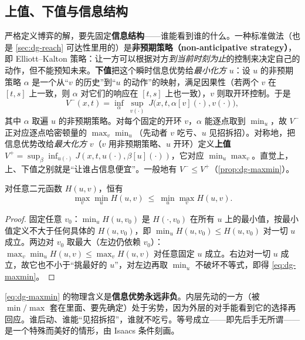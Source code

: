 \subsection{上值、下值与信息结构}
\label{sec:dg-info}
严格定义博弈的解，要先固定\textbf{信息结构}——谁能看到谁的什么。一种标准做法（也是 \cref{sec:dg-reach} 可达性里用的）是\textbf{非预期策略（non-anticipative strategy）}，即 Elliott--Kalton 策略：让一方可以根据对方\emph{到当前时刻为止}的控制来决定自己的动作，但不能预知未来。\textbf{下值}把这个瞬时信息优势给\emph{最小化方} $u$：设 $u$ 的非预期策略 $\alpha$ 是一个从“$v$ 的历史”到“$u$ 的动作”的映射，满足因果性（若两个 $v$ 在 $[t,s]$ 上一致，则 $\alpha$ 对它们的响应在 $[t,s]$ 上也一致），$v$ 则取开环控制。于是
\begin{equation}
  V^-(x,t)=\inf_{\alpha}\ \sup_{v(\cdot)}\ J\big(x,t,\alpha[v](\cdot),v(\cdot)\big),
  \label{eq:dg-lower}
\end{equation}
其中 $\alpha$ 取遍 $u$ 的非预期策略。对每个固定的开环 $v$，$\alpha$ 能逐点取到 $\min_u$，故 $V^-$ 正对应逐点哈密顿量的 $\max_v\min_u$（先动者 $v$ 吃亏、$u$ 见招拆招）。对称地，把信息优势改给\emph{最大化方} $v$（$v$ 用非预期策略、$u$ 开环）定义\textbf{上值} $V^+=\sup_{\beta}\inf_{u(\cdot)}J(x,t,u(\cdot),\beta[u](\cdot))$，它对应 $\min_u\max_v$。直觉上，上、下值之别就是“让谁占信息便宜”。一般地有 $V^-\le V^+$（\cref{prop:dg-maxmin}）。

\begin{proposition}
\label{prop:dg-maxmin}
对任意二元函数 $H(u,v)$，恒有
\begin{equation}
  \max_{v}\min_{u}H(u,v)\ \le\ \min_{u}\max_{v}H(u,v).
  \label{eq:dg-maxmin}
\end{equation}
\end{proposition}
\begin{proof}
固定任意 $v_0$：$\min_u H(u,v_0)$ 是 $H(\cdot,v_0)$ 在所有 $u$ 上的最小值，按最小值定义不大于任何具体的 $H(u,v_0)$，即 $\min_u H(u,v_0)\le H(u,v_0)$ 对一切 $u$ 成立。两边对 $v_0$ 取最大（左边仍依赖 $v_0$）：$\max_v\min_u H(u,v)\le\max_v H(u,v)$ 对任意固定 $u$ 成立。右边对一切 $u$ 成立，故它也不小于“挑最好的 $u$”，对左边再取 $\min_u$ 不破坏不等式，即得 \cref{eq:dg-maxmin}。
\end{proof}

\begin{insight}
\cref{eq:dg-maxmin} 的物理含义是\textbf{信息优势永远非负}。内层先动的一方（被 $\min/\max$ 套在里面、要先确定）处于劣势，因为外层的对手能看到它的选择再回应。谁后动、谁能“见招拆招”，谁就不吃亏。等号成立——即先后手无所谓——是一个特殊而美好的情形，由 Isaacs 条件刻画。
\end{insight}

